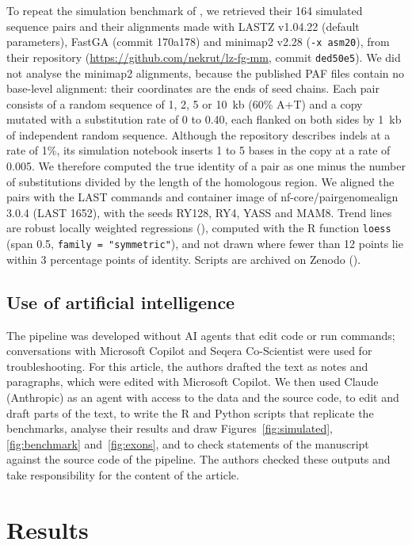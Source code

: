 \documentclass[PCJ,Unicode,screen]{cedram}
\begin{document}
To repeat the simulation benchmark of \citet{Gulhan_2025}, we retrieved their 164 simulated sequence pairs and their alignments made with LASTZ v1.04.22 (default parameters), FastGA (commit 170a178) and minimap2 v2.28 (\texttt{-x asm20}), from their repository (\url{https://github.com/nekrut/lz-fg-mm}, commit \texttt{ded50e5}). We did not analyse the minimap2 alignments, because the published PAF files contain no base-level alignment: their coordinates are the ends of seed chains. Each pair consists of a random sequence of 1, 2, 5 or 10~kb (60\% A+T) and a copy mutated with a substitution rate of 0 to 0.40, each flanked on both sides by 1~kb of independent random sequence. Although the repository describes indels at a rate of 1\%, its simulation notebook inserts 1 to 5 bases in the copy at a rate of 0.005. We therefore computed the true identity of a pair as one minus the number of substitutions divided by the length of the homologous region. We aligned the pairs with the LAST commands and container image of nf-core/pairgenomealign 3.0.4 (LAST 1652), with the seeds RY128, RY4, YASS and MAM8. Trend lines are robust locally weighted regressions (\cite{Cleveland_1979}), computed with the R function \texttt{loess} (span 0.5, \texttt{family = "symmetric"}), and not drawn where fewer than 12 points lie within 3 percentage points of identity. Scripts are archived on Zenodo (\cite{pairgenomealign_paper_data}).

\subsection*{Use of artificial intelligence}

The pipeline was developed without AI agents that edit code or run commands; conversations with Microsoft Copilot and Seqera Co-Scientist were used for troubleshooting. For this article, the authors drafted the text as notes and paragraphs, which were edited with Microsoft Copilot. We then used Claude (Anthropic) as an agent with access to the data and the source code, to edit and draft parts of the text, to write the R and Python scripts that replicate the benchmarks, analyse their results and draw Figures~\ref{fig:simulated}, \ref{fig:benchmark} and~\ref{fig:exons}, and to check statements of the manuscript against the source code of the pipeline. The authors checked these outputs and take responsibility for the content of the article.

\section*{Results}
\end{document}
